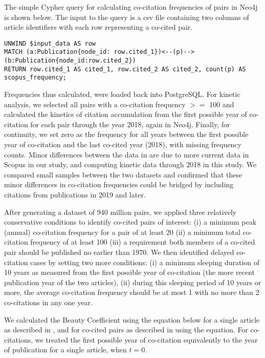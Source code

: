 \documentclass[utf8]{frontiersSCNS}
\begin{document}
The simple Cypher query for calculating co-citation frequencies of pairs in Neo4j is shown below. The input to the query is a csv file containing two columns of article identifiers with each row representing a co-cited pair.  
\vspace{2 mm}
\lstset{language=Pascal, basicstyle=\footnotesize} 
\begin{lstlisting}[frame=single]
UNWIND $input_data AS row
MATCH (a:Publication{node_id: row.cited_1})<--(p)-->(b:Publication{node_id:row.cited_2})
RETURN row.cited_1 AS cited_1, row.cited_2 AS cited_2, count(p) AS scopus_frequency;
\end{lstlisting}


Frequencies thus calculated, were loaded back into PostgreSQL. For kinetic analysis, we selected all pairs with a co-citation frequency $>=$ 100 and calculated the kinetics of citation accumulation from the first possible year of co-citation for each pair through the year 2018, again in Neo4j.  Finally, for continuity, we set zero as the frequency for all years between the first possible year of co-citation and the last co-cited year (2018), with  missing frequency counts. Minor differences between the data in  \cite{devarakonda_2020} are due to more current data in Scopus in our study, and computing kinetic data through 2018 in this study. We compared small samples between the two datasets and confirmed that these minor differences in co-citation frequencies could be bridged by including citations from publications in 2019 and later. 

After generating a dataset of 940 million pairs, we applied three relatively conservative conditions to identify co-cited pairs of interest: (i) a minimum peak (annual) co-citation frequency for a pair of at least 20 (ii) a minimum total co-citation frequency of at least 100 (iii) a requirement both members of a co-cited pair should be published no earlier than 1970. We then identified delayed co-citation cases by setting two more conditions: (i) a minimum sleeping duration of 10 years as measured from the first possible year of co-citation (the more recent publication year of the two articles), (ii) during this sleeping period of 10 years or more, the average co-citation frequency should be at most 1 with no more than 2 co-citations in any one year. 

We calculated the Beauty Coefficient using the equation below for a single article as described in \cite{Ke2015}, and for co-cited pairs as described in \cite{devarakonda_2020} using the equation. For co-citations, we treated the first possible year of co-citation equivalently to the year of publication for a single article, when $t=0$.
\end{document}
